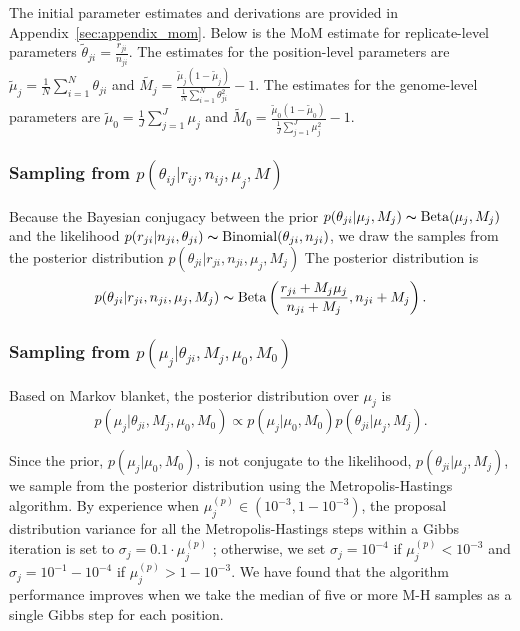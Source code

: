 \documentclass{bioinfo}
\begin{document}
The initial parameter estimates and derivations are provided in Appendix~\ref{sec:appendix_mom}. Below is the MoM estimate for replicate-level parameters
$\tilde{\theta}_{ji} = \frac{r_{ji}} {n_{ji}}$.
The estimates for the position-level parameters are
$\tilde{\mu}_j = \frac{1}{N} \sum_{i=1}^N \theta_{ji}$
and
$\tilde{M_j} = \frac{ \tilde{\mu}_j (1 - \tilde{\mu}_j ) } { \frac{1}{N} \sum_{i=1}^N \theta_{ji}^2 } -1$.
The estimates for the genome-level parameters are
$\tilde{\mu}_0 = \frac{1}{J} \sum_{j=1}^J \mu_j$
and
$\tilde{M}_0 = \frac{ \tilde{\mu}_0 (1 - \tilde{\mu}_0 ) } {\frac{1}{J} \sum_{j=1}^J \mu_j^2 } -1$.

\subsubsection{Sampling from $p \left( \theta_{ij} |r_{ij},n_{ij},\mu_j,M \right)$}

Because the Bayesian conjugacy between the prior
$p(\theta_{ji} | \mu_j, M_j) \thicksim \text{Beta}(\mu_j, M_j)$
and the likelihood
$p(r_{ji} | n_{ji}, \theta_{ji}) \thicksim \text{Binomial}(\theta_{ji}, n_{ji})$,
we draw the samples from the posterior distribution
$p(\theta_{ji} | r_{ji}, n_{ji}, \mu_j, M_j)$
The posterior distribution is
\begin{equation}
	p(\theta_{ji} | r_{ji}, n_{ji}, \mu_j, M_j) \thicksim \text{Beta}\left( \frac{r_{ji} + M_j \mu_j}{n_{ji} + M_j} , n_{ji} + M_j\right).
\end{equation}

\subsubsection{Sampling from $p \left( \mu_j |\theta_{ji},M_j,\mu_0,M_0\right)$}
Based on Markov blanket, the posterior distribution over $\mu_j$ is
\begin{equation}
	p( \mu_j | \theta_{ji}, M_j, \mu_0, M_0 ) \propto p(\mu_j | \mu_0, M_0) p(\theta_{ji} | \mu_j, M_j).
\end{equation}

Since the prior, $p(\mu_j | \mu_0, M_0)$, is not conjugate to the likelihood, $p(\theta_{ji} | \mu_j, M_j)$, we sample from the posterior distribution using the Metropolis-Hastings algorithm.
By experience when $\mu_j^{(p)} \in (10^{-3},1-10^{-3})$, the proposal distribution variance for all the Metropolis-Hastings steps within a Gibbs iteration is set to $\sigma_j = 0.1 \cdot \mu_j^{(p)}$ ;
otherwise, we set $\sigma_j = 10^{-4}$ if $\mu_j^{(p)}< 10^{-3}$ and $\sigma_j = 10^{-1}-10^{-4}$ if $\mu_j^{(p)}>1-10^{-3}$.
We have found that the algorithm performance improves when we take the median of five or more M-H samples as a single Gibbs step for each position.
\end{document}
